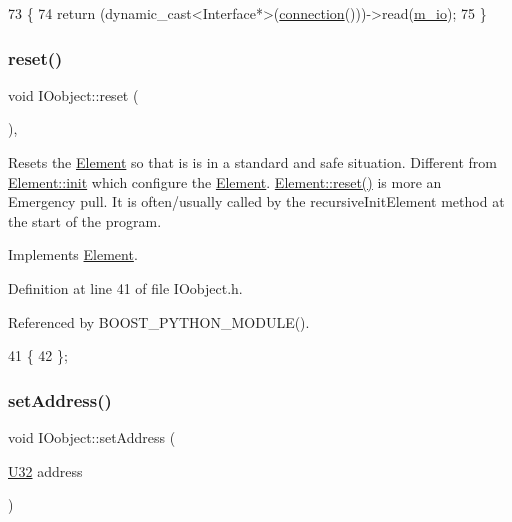 \begin{DoxyCode}
73                            \{
74     \textcolor{keywordflow}{return} (dynamic\_cast<Interface*>(\hyperlink{classElement_af57444353c1ddf9fa0109801e97debf7}{connection}()))->read(\hyperlink{classIOobject_aa648e4128c3c37d8291d6bb26b57c504}{m\_io});
75   \}
\end{DoxyCode}
\mbox{\label{classIOobject_abccbc7a65366ec1257ff41a8e3245af8}} 
\subsubsection{\texorpdfstring{reset()}{reset()}}
{\footnotesize\ttfamily void I\+Oobject\+::reset (\begin{DoxyParamCaption}{ }\end{DoxyParamCaption})\hspace{0.3cm}{\ttfamily [inline]}, {\ttfamily [virtual]}}

Resets the \hyperlink{classElement}{Element} so that is is in a standard and safe situation. Different from \hyperlink{classElement_af42754b5cabc198869222725218d695c}{Element\+::init} which configure the \hyperlink{classElement}{Element}. \hyperlink{classElement_a69efffa22f06909d768149715565cb56}{Element\+::reset()} is more an Emergency pull. It is often/usually called by the recursive\+Init\+Element method at the start of the program. 

Implements \hyperlink{classElement_a69efffa22f06909d768149715565cb56}{Element}.



Definition at line 41 of file I\+Oobject.\+h.



Referenced by B\+O\+O\+S\+T\+\_\+\+P\+Y\+T\+H\+O\+N\+\_\+\+M\+O\+D\+U\+L\+E().


\begin{DoxyCode}
41                \{
42   \};
\end{DoxyCode}
\mbox{\label{classIOobject_ae0d372aaeafe3da3c239677118deb2ac}} 
\subsubsection{\texorpdfstring{set\+Address()}{setAddress()}}
{\footnotesize\ttfamily void I\+Oobject\+::set\+Address (\begin{DoxyParamCaption}\item[{\hyperlink{classIOobject_ad5bc21e44080074fe1068dc83861a090}{U32}}]{address }\end{DoxyParamCaption})\hspace{0.3cm}{\ttfamily [inline]}}



